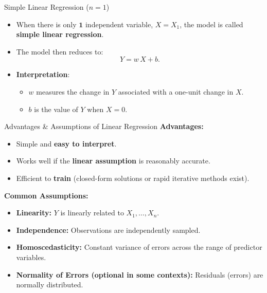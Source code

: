 \begin{frame}{Simple Linear Regression (\(n=1\))}
\begin{itemize}
    \item When there is only \(\mathbf{1}\) independent variable, \(X = X_1\), the model is called \textbf{simple linear regression}.
    \item The model then reduces to:
    \[
    Y = w\,X + b.
    \]
    \item \textbf{Interpretation}:
    \begin{itemize}
        \item \(w\) measures the change in \(Y\) associated with a one-unit change in \(X\).
        \item \(b\) is the value of \(Y\) when \(X=0\).
    \end{itemize}
\end{itemize}
\end{frame}

\begin{frame}{Advantages \& Assumptions of Linear Regression}
\textbf{Advantages:}
\begin{itemize}
    \item Simple and \textbf{easy to interpret}.
    \item Works well if the \textbf{linear assumption} is reasonably accurate.
    \item Efficient to \textbf{train} (closed-form solutions or rapid iterative methods exist).
\end{itemize}

\vfill

\textbf{Common Assumptions:}
\begin{itemize}
    \item \textbf{Linearity:} \(Y\) is linearly related to \(X_1, \dots, X_n\).
    \item \textbf{Independence:} Observations are independently sampled.
    \item \textbf{Homoscedasticity:} Constant variance of errors across the range of predictor variables.
    \item \textbf{Normality of Errors (optional in some contexts):} Residuals (errors) are normally distributed.
\end{itemize}
\end{frame}


